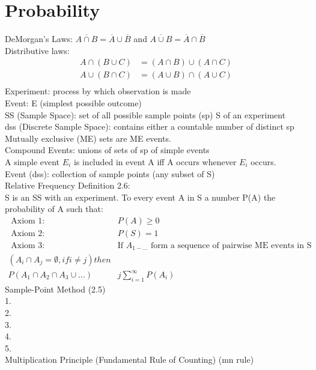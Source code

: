 \documentclass[12pt]{article}
\newcommand{\uu}{\overline}
\begin{document}
\section{Probability}
	DeMorgan's Laws: $ \uu{A \cap B} = \uu{A} \cup \uu{B}   $ and
	$ \uu{A \cup B} = \uu{A} \cap \uu{B} $ \\
	Distributive laws:
	\begin{align*}
		A \cap (B \cup C) &= (A \cap B) \cup (A \cap C) \\
		A \cup (B \cap C) &= (A \cup B) \cap (A \cup C) \\
	\end{align*}
	Experiment: process by which observation is made \\
	Event: E (simplest possible outcome) \\
	SS (Sample Space): set of all possible sample points (sp) S of an experiment \\
	dss (Discrete Sample Space): contains either a countable number of distinct sp \\
	Mutually exclusive (ME) sets are ME events. \\
	Compound Events: unions of sets of sp of simple events \\
	A simple event $ E_i $ is included in event A iff A occurs whenever $ E_i $ occurs. \\
	Event (dss): collection of sample points (any subset of S) \\
	Relative Frequency Definition 2.6: \\
		S is an SS with an experiment. To every event A in S a number P(A)
		the probability of A such that:
		\begin{align*}
			\text{ Axiom 1: }& P(A) \ge 0 \\
			\text{ Axiom 2: }& P(S) = 1 \\
			\text{ Axiom 3: }& \text{If } A_{1-...} 
			\text{ form a sequence of pairwise ME events in S } \\
			(A_i \cap  A_j = \emptyset, if i \ne j) then \\
			P(A_1 \cap A_2 \cap A_3 \cup ...) &j \sum^{\infty}_{i=1}P(A_i)
		\end{align*}
	Sample-Point Method (2.5)\\
	1. \\
	2. \\
	3. \\
	4. \\
	5. \\
	Multiplication Principle (Fundamental Rule of Counting) (mn rule) \\
\end{document}
